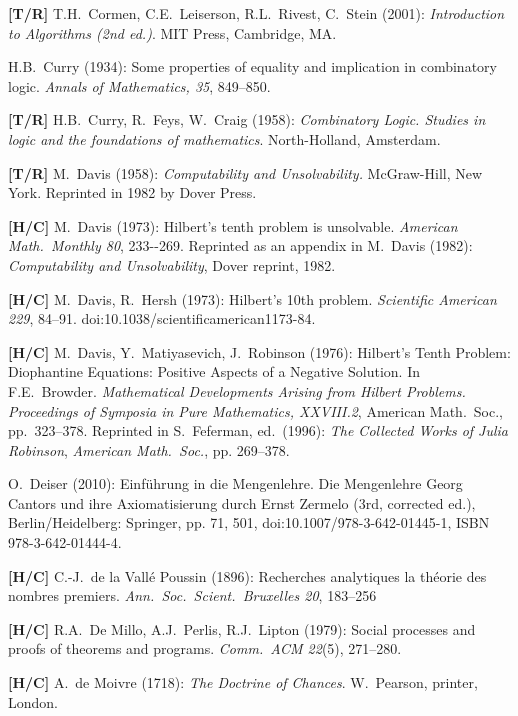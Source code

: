\begin{thebibliography}{999}
{\bf [T/R]}
T.H.~Cormen, C.E.~Leiserson, R.L.~Rivest, C.~Stein (2001):
{\it Introduction to Algorithms (2nd ed.)}.
MIT Press, Cambridge, MA.

H.B.~Curry (1934): Some properties of equality and implication in combinatory logic.  {\it Annals of Mathematics, 35}, 849--850.

{\bf [T/R]}
H.B.~Curry, R.~Feys, W.~Craig (1958): {\it Combinatory Logic.  Studies in logic and the foundations of mathematics}.  North-Holland, Amsterdam.


{\bf [T/R]}
M.~Davis (1958): {\it Computability and Unsolvability.}
McGraw-Hill, New York.  Reprinted in 1982 by Dover Press.

{\bf [H/C]}
M.~Davis (1973):
Hilbert's tenth problem is unsolvable.
{\it American Math.~Monthly 80}, 233--269.  Reprinted as an appendix
in M.~Davis (1982): {\it Computability and Unsolvability}, Dover reprint, 1982.

{\bf [H/C]}
M.~Davis, R.~Hersh (1973): Hilbert's 10th problem.  {\it Scientific American 229},
84--91.  doi:10.1038/scientificamerican1173-84.

{\bf [H/C]}
M.~Davis, Y.~Matiyasevich, J.~Robinson (1976): Hilbert's Tenth Problem: Diophantine Equations: Positive Aspects of a Negative Solution.  In F.E.~Browder.  {\it Mathematical Developments Arising from Hilbert Problems.}  {\it Proceedings of Symposia in Pure Mathematics, XXVIII.2}, American Math.~Soc., pp.~323--378.  Reprinted in S.~Feferman, ed.~(1996): {\it The Collected Works of Julia Robinson}, {\it American Math.~Soc.}, pp. 269--378.

O.~Deiser (2010): Einf\"{u}hrung in die Mengenlehre.  Die Mengenlehre Georg Cantors und ihre Axiomatisierung durch Ernst Zermelo (3rd, corrected ed.), Berlin/Heidelberg: Springer, pp. 71, 501, doi:10.1007/978-3-642-01445-1, ISBN 978-3-642-01444-4.

{\bf [H/C]}
C.-J.~de la Vall\'{e} Poussin (1896): Recherches analytiques la th\'{e}orie des nombres premiers.
{\it Ann.~Soc.~Scient.~Bruxelles 20}, 183--256

{\bf [H/C]}
R.A.~De Millo, A.J.~Perlis, R.J.~Lipton (1979): Social processes and proofs of theorems and programs.  {\it Comm.~ACM 22}(5), 271--280.

{\bf [H/C]}
A.~de Moivre (1718): {\it The Doctrine of Chances}.  W.~Pearson, printer, London.



\end{thebibliography}
